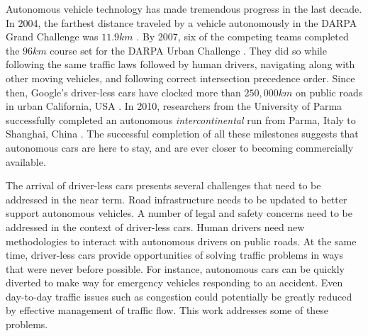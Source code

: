 \documentclass[letterpaper, 10 pt, conference]{ieeeconf}  %
\begin{document}
Autonomous vehicle technology has made tremendous progress in the last decade.
In 2004, the farthest distance traveled by a vehicle autonomously in the DARPA
Grand Challenge was $11.9km$ \cite{cnnGrandChallenge2004}. By 2007, six of the
competing teams completed the $96km$ course set for the DARPA Urban Challenge
\cite{spectrumUrbanChallenge2007}. They did so while following the same traffic
laws followed by human drivers, navigating along with other moving vehicles,
and following correct intersection precedence order. Since then, Google's
driver-less cars have clocked more than $250,000km$ on public roads in urban
California, USA \cite{tedThrun2011}. In 2010, researchers from the University
of Parma successfully completed an autonomous \textit{intercontinental} run
from Parma, Italy to Shanghai, China \cite{cnnVislab2010}. The successful
completion of all these milestones suggests that autonomous cars are here to
stay, and are ever closer to becoming commercially available. 

The arrival of driver-less cars presents several challenges that need to be
addressed in the near term. Road infrastructure needs to be updated to better
support autonomous vehicles. A number of legal and safety concerns need to be
addressed in the context of driver-less cars. Human drivers need new
methodologies to interact with autonomous drivers on public roads. At the same
time, driver-less cars provide opportunities of solving traffic problems in
ways that were never before possible. For instance, autonomous cars can be
quickly diverted to make way for emergency vehicles responding to an accident.
Even day-to-day traffic issues such as congestion could potentially be greatly
reduced by effective management of traffic flow. This work addresses
some of these problems.


\end{document}
